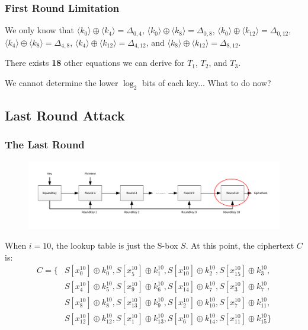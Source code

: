 \documentclass[9pt,handout]{beamer}
\begin{document}
\begin{frame}
	\frametitle{First Round Limitation}
We only know that $\langle k_0 \rangle \oplus \langle k_4 \rangle = \Delta_{0,4}$, $\langle k_0 \rangle \oplus \langle k_8 \rangle = \Delta_{0,8}$,
$\langle k_0 \rangle \oplus \langle k_{12} \rangle = \Delta_{0,12}$, $\langle k_4 \rangle \oplus \langle k_8 \rangle = \Delta_{4,8}$, 
$\langle k_4 \rangle \oplus \langle k_{12} \rangle = \Delta_{4,12}$, and $\langle k_8 \rangle \oplus \langle k_{12} \rangle = \Delta_{8,12}$.

\bigskip

There exists \textbf{18} other equations we can derive for $T_1$, $T_2$, and $T_3$.

\bigskip

We cannot determine the lower $\log_2$ bits of each key... What to do now?

\end{frame}

\subsection{Last Round Attack}
\begin{frame}
	\frametitle{The Last Round}
	\vspace{-4em}
\begin{figure}
\centering
\includegraphics[scale = 0.5]{images/aesAttack_last.pdf}
\end{figure}
	When $i = 10$, the lookup table is just the S-box $S$. At this point, the ciphertext $C$ is:
\begin{align*}
C = \{ & S[x_0^{10}] \oplus k_0^{10}, S[x_5^{10}] \oplus k_1^{10}, S[x_{10}^{10}] \oplus k_2^{10}, S[x_{15}^{10}] \oplus k_3^{10}, \\
& S[x_4^{10}] \oplus k_5^{10}, S[x_9^{10}] \oplus k_6^{10}, S[x_{14}^{10}] \oplus k_7^{10}, S[x_3^{10}] \oplus k_7^{10}, \\
& S[x_8^{10}] \oplus k_8^{10}, S[x_{13}^{10}] \oplus k_9^{10}, S[x_2^{10}] \oplus k_{10}^{10}, S[x_7^{10}] \oplus k_{11}^{10}, \\
& S[x_{12}^{10}] \oplus k_{12}^{10}, S[x_{1}^{10}] \oplus k_{13}^{10}, S[x_6^{10}] \oplus k_{14}^{10}, S[x_{11}^{10}] \oplus k_{15}^{10}\} 
\end{align*}
\end{frame}
\end{document}
